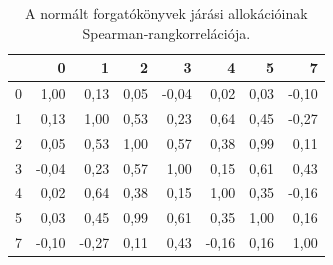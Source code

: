 \begin{table}[htbp]
\centering
\small
\begin{tabular}{lrrrrrrr}
\toprule
 & 0 & 1 & 2 & 3 & 4 & 5 & 7 \\
\midrule
0 & 1{,}00 & 0{,}13 & 0{,}05 & -0{,}04 & 0{,}02 & 0{,}03 & -0{,}10 \\
1 & 0{,}13 & 1{,}00 & 0{,}53 & 0{,}23 & 0{,}64 & 0{,}45 & -0{,}27 \\
2 & 0{,}05 & 0{,}53 & 1{,}00 & 0{,}57 & 0{,}38 & 0{,}99 & 0{,}11 \\
3 & -0{,}04 & 0{,}23 & 0{,}57 & 1{,}00 & 0{,}15 & 0{,}61 & 0{,}43 \\
4 & 0{,}02 & 0{,}64 & 0{,}38 & 0{,}15 & 1{,}00 & 0{,}35 & -0{,}16 \\
5 & 0{,}03 & 0{,}45 & 0{,}99 & 0{,}61 & 0{,}35 & 1{,}00 & 0{,}16 \\
7 & -0{,}10 & -0{,}27 & 0{,}11 & 0{,}43 & -0{,}16 & 0{,}16 & 1{,}00 \\
\bottomrule
\end{tabular}
\caption{A normált forgatókönyvek járási allokációinak Spearman‑rangkorrelációja.}
\label{tab:spearman}
\end{table}
